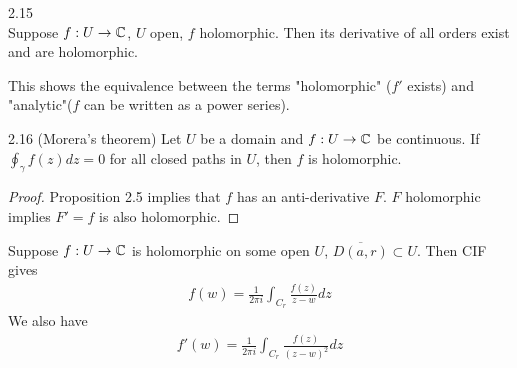 \documentclass[a4paper]{article}
\begin{document}
\begin{coro} 2.15\\
Suppose $f:U \to \mathbb{C}$, $U$ open, $f$ holomorphic. Then its derivative of all orders exist and are holomorphic.
\end{coro}

\begin{rem}
This shows the equivalence between the terms "holomorphic" ($f'$ exists) and "analytic"($f$ can be written as a power series).
\end{rem}

\begin{coro} 2.16 (Morera's theorem) Let $U$ be a domain and $f:U \to \mathbb{C}$ be continuous. If $\oint_\gamma f(z) dz=0$ for all closed paths in $U$, then $f$ is holomorphic.
\begin{proof}
Proposition 2.5 implies that $f$ has an anti-derivative $F$. $F$ holomorphic implies $F' = f$ is also holomorphic.
\end{proof}
\end{coro}

Suppose $f:U \to \mathbb{C}$ is holomorphic on some open $U$, $\overline{D(a,r)} \subset U$. Then CIF gives
\begin{equation*}
\begin{aligned}
f(w) = \frac{1}{2\pi i} \int_{C_r} \frac{f(z)}{z-w} dz
\end{aligned}
\end{equation*}
We also have
\begin{equation*}
\begin{aligned}
f'(w) = \frac{1}{2\pi i} \int_{C_r} \frac{f(z)}{(z-w)^2} dz
\end{aligned}
\end{equation*}
\end{document}
